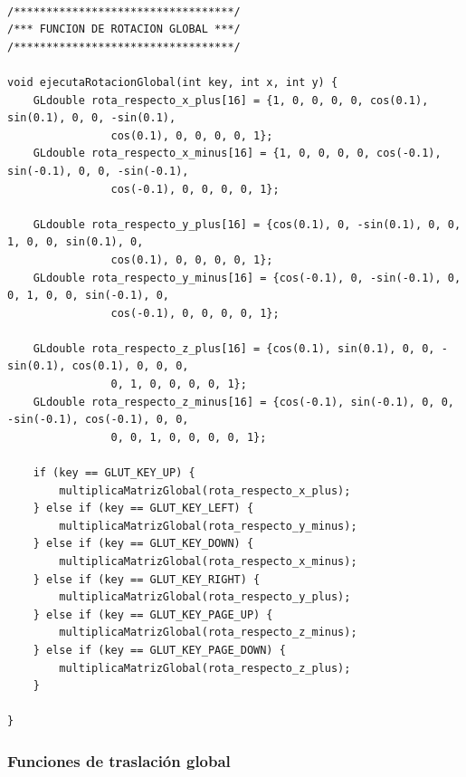 \documentclass[12pt,a4paper]{article}
\begin{document}
\begin{lstlisting}

/**********************************/
/*** FUNCION DE ROTACION GLOBAL ***/
/**********************************/

void ejecutaRotacionGlobal(int key, int x, int y) {
    GLdouble rota_respecto_x_plus[16] = {1, 0, 0, 0, 0, cos(0.1), sin(0.1), 0, 0, -sin(0.1), 
    			cos(0.1), 0, 0, 0, 0, 1};
    GLdouble rota_respecto_x_minus[16] = {1, 0, 0, 0, 0, cos(-0.1), sin(-0.1), 0, 0, -sin(-0.1), 
    			cos(-0.1), 0, 0, 0, 0, 1};

    GLdouble rota_respecto_y_plus[16] = {cos(0.1), 0, -sin(0.1), 0, 0, 1, 0, 0, sin(0.1), 0, 
    			cos(0.1), 0, 0, 0, 0, 1};
    GLdouble rota_respecto_y_minus[16] = {cos(-0.1), 0, -sin(-0.1), 0, 0, 1, 0, 0, sin(-0.1), 0, 
    			cos(-0.1), 0, 0, 0, 0, 1};

    GLdouble rota_respecto_z_plus[16] = {cos(0.1), sin(0.1), 0, 0, -sin(0.1), cos(0.1), 0, 0, 0, 
    			0, 1, 0, 0, 0, 0, 1};
    GLdouble rota_respecto_z_minus[16] = {cos(-0.1), sin(-0.1), 0, 0, -sin(-0.1), cos(-0.1), 0, 0, 
    			0, 0, 1, 0, 0, 0, 0, 1};

    if (key == GLUT_KEY_UP) {
        multiplicaMatrizGlobal(rota_respecto_x_plus);
    } else if (key == GLUT_KEY_LEFT) {
        multiplicaMatrizGlobal(rota_respecto_y_minus);
    } else if (key == GLUT_KEY_DOWN) {
        multiplicaMatrizGlobal(rota_respecto_x_minus);
    } else if (key == GLUT_KEY_RIGHT) {
        multiplicaMatrizGlobal(rota_respecto_y_plus);
    } else if (key == GLUT_KEY_PAGE_UP) {
        multiplicaMatrizGlobal(rota_respecto_z_minus);
    } else if (key == GLUT_KEY_PAGE_DOWN) {
        multiplicaMatrizGlobal(rota_respecto_z_plus);
    }

}

\end{lstlisting}

\subsubsection{Funciones de traslación global}
\end{document}
